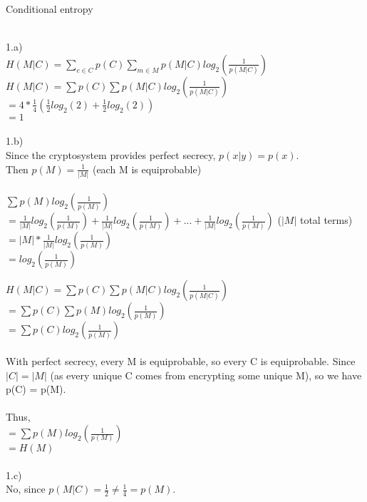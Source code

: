 \documentclass{assignment}
\newcommand\tab[1][0.5cm]{\hspace*{#1}}
\begin{document}
\begin{problemlist}
\pbitem Conditional entropy
\begin{problem}
\begin{answer}
\\
1.a)\\
$H(M|C)=\sum_{c\in C}p(C)\sum_{m\in M}p(M|C)log_2(\frac{1}{p(M|C)})$\\
$H(M|C)=\sum p(C)\sum p(M|C)log_2(\frac{1}{p(M|C)})$\\
$=4*\frac{1}{4}(\frac{1}{2}log_2(2)+ \frac{1}{2}log_2(2))$\\
$=1$\\
\\
1.b)\\
Since the cryptosystem provides perfect secrecy, $p(x|y)=p(x)$.\\
Then $p(M) = \frac{1}{|M|}$ (each M is equiprobable)\\
\\
$\sum p(M)log_2(\frac{1}{p(M)})$\\
\tab$=\frac{1}{|M|}log_2(\frac{1}{p(M)})+\frac{1}{|M|}log_2(\frac{1}{p(M)})+...+\frac{1}{|M|}log_2(\frac{1}{p(M)})$  ($|M|$ total terms)\\
\tab$=|M|*\frac{1}{|M|}log_2(\frac{1}{p(M)})$ \\
\tab$=log_2(\frac{1}{p(M)})$ 

$H(M|C)=\sum p(C)\sum p(M|C)log_2(\frac{1}{p(M|C)})$\\
$=\sum p(C)\sum p(M)log_2(\frac{1}{p(M)})$\\
$=\sum p(C)log_2(\frac{1}{p(M)})$\\
\\
With perfect secrecy, every M is equiprobable, so every C is equiprobable.
Since $|C| = |M|$  (as every unique C comes from encrypting some unique M), so we have
p(C) = p(M).\\
\\
Thus,\\

$=\sum p(M)log_2(\frac{1}{p(M)})$\\
$=H(M)$\\
\\
1.c)\\
No, since $p(M|C)=\frac{1}{2}\neq\frac{1}{4}=p(M)$.\\
\\
\end{answer}
\end{problem}


\end{problemlist}
\end{document}
